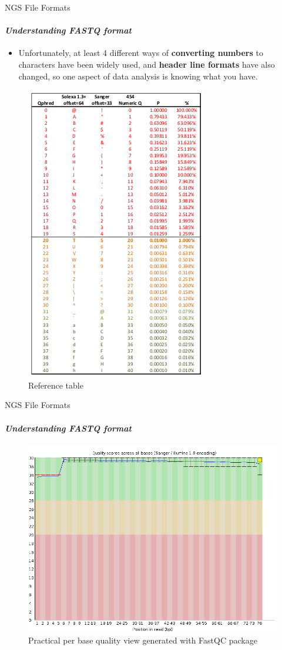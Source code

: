 \documentclass{if-beamer}
\begin{document}
\begin{frame}{NGS File Formats}
\framesubtitle{\emph{Understanding FASTQ format}}
\begin{itemize}
    \item Unfortunately, at least 4 different ways of \textbf{converting numbers} to characters have been widely used, and \textbf{header line formats} have also changed, so one aspect of data analysis is knowing what you have.
\end{itemize} 
\begin{figure}
\centering
\includegraphics[scale=0.4]{ref_table_quality2.PNG}
\caption{Reference table}
\end{figure}
\end{frame}
\begin{frame}{NGS File Formats}
\framesubtitle{\emph{Understanding FASTQ format}}
\begin{figure}
\centering
\includegraphics[scale=0.3]{per_base_quality.png}
\caption{Practical per base quality view generated with FastQC package}
\end{figure}
\end{frame}
\end{document}

